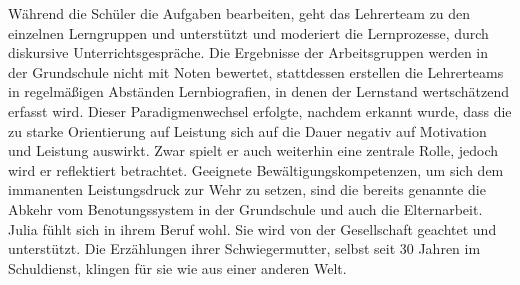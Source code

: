 \documentclass[12pt,a4paper]{article}
\begin{document}
\begin{appendix}
Während die Schüler die Aufgaben bearbeiten, geht das Lehrerteam zu den einzelnen Lerngruppen und unterstützt und moderiert die Lernprozesse, durch diskursive Unterrichtsgespräche.
Die Ergebnisse der Arbeitsgruppen werden in der Grundschule nicht mit Noten bewertet, stattdessen erstellen die Lehrerteams in regelmäßigen Abständen Lernbiografien, in denen der Lernstand wertschätzend erfasst wird. Dieser Paradigmenwechsel erfolgte, nachdem erkannt wurde, dass die zu starke Orientierung auf Leistung sich auf die Dauer negativ auf Motivation und Leistung auswirkt. Zwar spielt er auch weiterhin eine zentrale Rolle, jedoch wird er reflektiert betrachtet. Geeignete Bewältigungskompetenzen, um sich dem immanenten Leistungsdruck zur Wehr zu setzen, sind die bereits genannte die Abkehr vom Benotungssystem in der Grundschule und auch die Elternarbeit.
Julia fühlt sich in ihrem Beruf wohl. Sie wird von der Gesellschaft geachtet und unterstützt. Die Erzählungen ihrer Schwiegermutter, selbst seit 30 Jahren im Schuldienst, klingen für sie wie aus einer anderen Welt.


\end{appendix}
\end{document}

